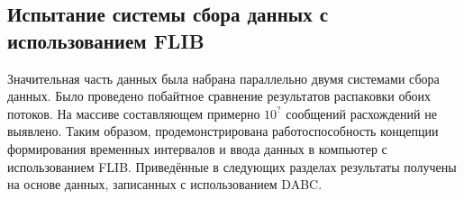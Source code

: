 \subsection{Испытание системы сбора данных с использованием FLIB}\label{section:flib}

Значительная часть данных была набрана параллельно двумя системами сбора данных. Было проведено побайтное сравнение результатов распаковки обоих потоков. На массиве составляющем примерно $ 10^{?} $ сообщений расхождений не выявлено. Таким образом, продемонстрирована работоспособность концепции формирования временных интервалов и ввода данных в компьютер с использованием FLIB. Приведённые в следующих разделах результаты получены на основе данных, записанных с использованием DABC.